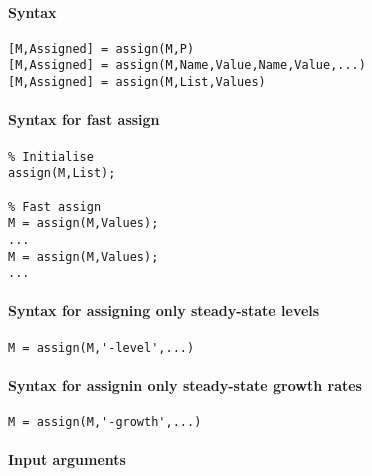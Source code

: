 


	\paragraph{Syntax}\label{syntax}

\begin{verbatim}
[M,Assigned] = assign(M,P)
[M,Assigned] = assign(M,Name,Value,Name,Value,...)
[M,Assigned] = assign(M,List,Values)
\end{verbatim}

\paragraph{Syntax for fast assign}\label{syntax-for-fast-assign}

\begin{verbatim}
% Initialise
assign(M,List);

% Fast assign
M = assign(M,Values);
...
M = assign(M,Values);
...
\end{verbatim}

\paragraph{Syntax for assigning only steady-state
levels}\label{syntax-for-assigning-only-steady-state-levels}

\begin{verbatim}
M = assign(M,'-level',...)
\end{verbatim}

\paragraph{Syntax for assignin only steady-state growth
rates}\label{syntax-for-assignin-only-steady-state-growth-rates}

\begin{verbatim}
M = assign(M,'-growth',...)
\end{verbatim}

\paragraph{Input arguments}\label{input-arguments}


